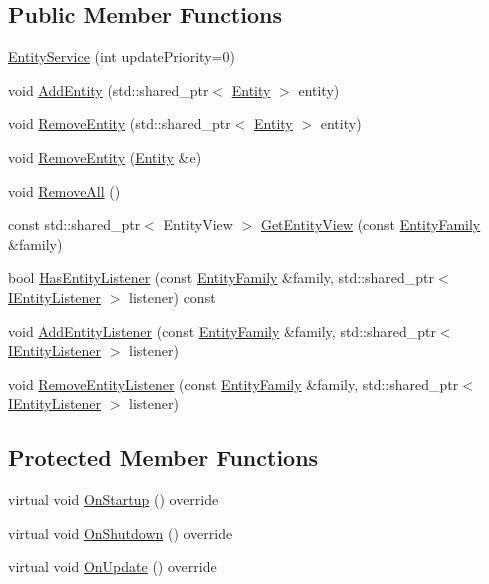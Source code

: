 \subsection*{Public Member Functions}
\begin{DoxyCompactItemize}
\item 
\hyperlink{classastu_1_1EntityService_af52258e21a92cd45a68482d0654fe0c7}{Entity\+Service} (int update\+Priority=0)
\item 
void \hyperlink{classastu_1_1EntityService_ad6c6cb81dc8c48c7688f438571ee5da8}{Add\+Entity} (std\+::shared\+\_\+ptr$<$ \hyperlink{classastu_1_1Entity}{Entity} $>$ entity)
\item 
void \hyperlink{classastu_1_1EntityService_a748a71e470d5bb51bb650b15e0a78c63}{Remove\+Entity} (std\+::shared\+\_\+ptr$<$ \hyperlink{classastu_1_1Entity}{Entity} $>$ entity)
\item 
void \hyperlink{classastu_1_1EntityService_a56effcd0e2c79f6b2030207541085bb5}{Remove\+Entity} (\hyperlink{classastu_1_1Entity}{Entity} \&e)
\item 
void \hyperlink{classastu_1_1EntityService_a1b21cf207324748c13c34568d3c1513e}{Remove\+All} ()
\item 
const std\+::shared\+\_\+ptr$<$ Entity\+View $>$ \hyperlink{classastu_1_1EntityService_aa295c07eb6a5c5321cf5820c9e41d008}{Get\+Entity\+View} (const \hyperlink{classastu_1_1EntityFamily}{Entity\+Family} \&family)
\item 
bool \hyperlink{classastu_1_1EntityService_a333b2d932a0ce15687c76b6c361a7e82}{Has\+Entity\+Listener} (const \hyperlink{classastu_1_1EntityFamily}{Entity\+Family} \&family, std\+::shared\+\_\+ptr$<$ \hyperlink{classastu_1_1IEntityListener}{I\+Entity\+Listener} $>$ listener) const
\item 
void \hyperlink{classastu_1_1EntityService_aa611795e8eca81a83909c9a71551a981}{Add\+Entity\+Listener} (const \hyperlink{classastu_1_1EntityFamily}{Entity\+Family} \&family, std\+::shared\+\_\+ptr$<$ \hyperlink{classastu_1_1IEntityListener}{I\+Entity\+Listener} $>$ listener)
\item 
void \hyperlink{classastu_1_1EntityService_a4ecee40a8872203bf75c6ddbf67a05c1}{Remove\+Entity\+Listener} (const \hyperlink{classastu_1_1EntityFamily}{Entity\+Family} \&family, std\+::shared\+\_\+ptr$<$ \hyperlink{classastu_1_1IEntityListener}{I\+Entity\+Listener} $>$ listener)
\end{DoxyCompactItemize}
\subsection*{Protected Member Functions}
\begin{DoxyCompactItemize}
\item 
virtual void \hyperlink{classastu_1_1EntityService_a293ff7c8b84837b08cdabe98ed8a23ea}{On\+Startup} () override
\item 
virtual void \hyperlink{classastu_1_1EntityService_ac998c4d02a90460a129c8f2e0586d728}{On\+Shutdown} () override
\item 
virtual void \hyperlink{classastu_1_1EntityService_a70831a8dc185652c2c9056c4e3cc10e0}{On\+Update} () override
\end{DoxyCompactItemize}
